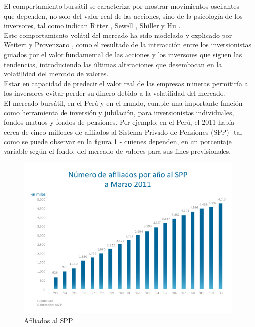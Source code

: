 
El comportamiento bursátil se caracteriza por mostrar movimientos oscilantes que dependen, no solo del valor real de las acciones, sino de la psicología de los inversores, tal como indican Ritter \cite{Ritter2003}, Sewell \cite{Sewell2010}, Shiller \cite{SHILLER1984} y Hu \cite{Hu2010}.\\

Este comportamiento volátil del mercado ha sido modelado y explicado por Weitert \cite{Christian2007} y Provenzano \cite{Provenzano2002}, como el resultado de la interacción entre los inversionistas guiados por el valor fundamental de las acciones y los inversores que siguen las tendencias, introduciendo las últimas alteraciones que desembocan en la volatilidad del mercado de valores.\\


Estar en capacidad de predecir el valor real de las empresas mineras permitiría a los inversores evitar perder su dinero debido a la volatilidad del mercado.\\


El mercado bursátil, en el Perú y en el mundo, cumple una importante función como herramienta de inversión y jubilación, para inversionistas individuales, fondos mutuos y fondos de pensiones. Por ejemplo, en el Perú, el 2011 había cerca de cinco millones de afiliados al Sistema Privado de Pensiones (SPP) -tal como se puede observar en la figura \ref{graf:afiliados-spp} \cite{AFP2011} - quienes dependen, en un porcentaje variable según el fondo, del mercado de valores para sus fines previsionales.\\


\begin{figure}
   \centering
   \includegraphics[scale=0.7]{imagenes/afiliados-marzo-2011.jpg}
   \caption{Afiliados al SPP \cite{AFP2011}}\label{graf:afiliados-spp}
\end{figure}



